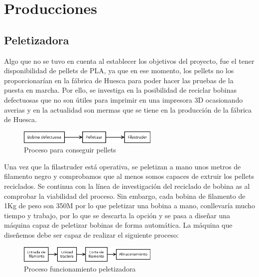 \chapter{Producciones}
\label{cap:producciones}

\section{Peletizadora}
\label{sec:peletizadora}

Algo que no se tuvo en cuenta al establecer los objetivos del proyecto, fue el tener disponibilidad de pellets de PLA, ya que en ese momento, los pellets no los proporcionarían en la fábrica de Huesca para poder hacer las pruebas de la puesta en marcha. Por ello, se investiga en la posibilidad de reciclar bobinas defectuosas que no son útiles para imprimir en una impresora 3D ocasionando averias y en la actualidad son mermas que se tiene en la producción de la fábrica de Huesca.

\begin{figure}[H]
    \centering
    \includegraphics[width=0.6\textwidth]{images/peletizadora/Diagram.png}
    \caption{Proceso para conseguir pellets}
    \label{fig:peletizadora_diagram}
\end{figure}

Una vez que la filastruder está operativa, se peletizan a mano unos metros de filamento negro y comprobamos que al menos somos capaces de extruir los pellets reciclados. Se continua con la línea de investigación del reciclado de bobina as al comprobar la viabilidad del proceso. Sin embargo, cada bobina de filamento de 1Kg de peso son 350M por lo que peletizar una bobina a mano, conllevaría mucho tiempo y trabajo, por lo que se descarta la opción y se pasa a diseñar una máquina capaz de peletizar bobinas de forma automática. La máquina que diseñemos debe ser capaz de realizar el siguiente proceso:

\begin{figure}[H]
    \centering
    \includegraphics[width=0.6\textwidth]{images/peletizadora/Diagram2.png}
    \caption{Proceso funcionamiento peletizadora}
    \label{fig:peletizadora_diagram2}
\end{figure}

